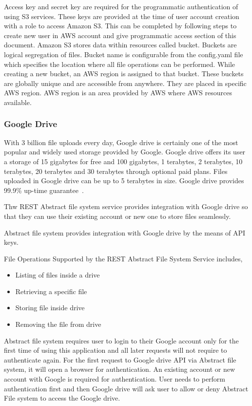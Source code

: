Access key and secret key are required for the programmatic
authentication of using S3 services. These keys are provided at the
time of user account creation with a role to access Amazon S3.  This
can be completed by following steps to create new user in AWS account
and give programmatic access section of this document.
Amazon S3 stores data within resources called bucket. Buckets are logical
segregation of files. Bucket name is configurable from the config.yaml file
which specifies the location where all file operations can be performed. 
While creating a new bucket, an AWS region is assigned to that bucket. These 
buckets are globally unique and are accessible from anywhere. They are
placed in specific AWS region. AWS region is an area provided by AWS where
AWS resources available.

\subsubsection{Google Drive}


With 3 billion file uploads every day, Google drive is certainly one of the 
most popular and widely used storage provided by Google. Google drive offers 
its user a storage of 15 gigabytes for free and 100 gigabytes, 1 terabytes, 2 
terabytes, 10 terabytes, 20 terabytes and 30 terabytes through optional paid 
plans. Files uploaded in Google drive can be up to 5 terabytes in size. Google 
drive provides 99.9\% up-time guarantee~\cite{hid-sp18-420-google-drive-wiki}. 

Thw REST Abstract file system service provides integration with Google
drive so that they can use their existing account or new one to store
files seamlessly.

Abstract file system provides integration with Google drive by the means of 
API keys. 

File Operations Supported by the REST Abstract File System Service includes,
\begin{itemize}
    \item  Listing of files inside a drive
    \item  Retrieving a specific file 
    \item  Storing file inside drive
    \item  Removing the file from drive
\end{itemize}

Abstract file system requires user to login to their Google
account only for the first time of using this application and all
later requests will not require to authenticate again.
For the first request to Google drive API via Abstract file system, it
will open a browser for authentication. An existing account or new
account with Google is required for authentication.
User needs to perform authentication first and then Google drive will
ask user to allow or deny Abstract File system to access the Google
drive.

